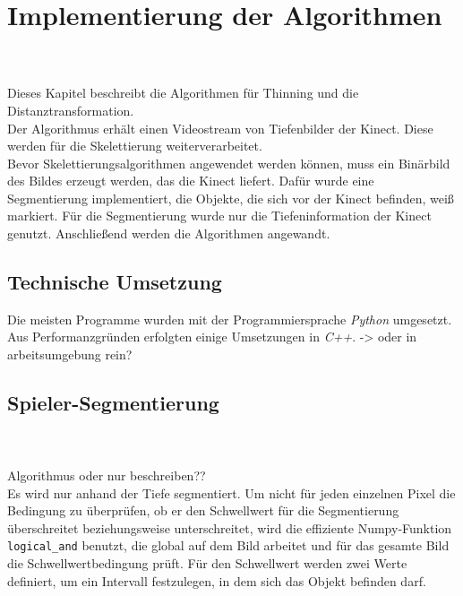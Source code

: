 \chapter{Implementierung der Algorithmen}
\\\\
Dieses Kapitel beschreibt die Algorithmen für Thinning und die Distanztransformation.\\
Der Algorithmus erhält einen Videostream von Tiefenbilder der Kinect. Diese werden für die
Skelettierung weiterverarbeitet. \\
Bevor Skelettierungsalgorithmen angewendet werden können, muss ein Binärbild des Bildes erzeugt werden, 
das die Kinect liefert. Dafür wurde eine Segmentierung implementiert, die Objekte, die sich vor der
Kinect befinden, weiß markiert. Für die Segmentierung wurde nur die Tiefeninformation der Kinect genutzt.
Anschließend werden die Algorithmen angewandt. 
\begin{algorithm}
\begin{algorithmic}[1]
\EndWhile
\EndProcedure
\end{algorithmic}
\end{algorithm}
\section{Technische Umsetzung}
Die meisten Programme wurden mit der Programmiersprache \emph{Python} umgesetzt. Aus Performanzgründen 
erfolgten einige Umsetzungen in \emph{C++}. -> oder in arbeitsumgebung rein?\\
\section{Spieler-Segmentierung}
\\\\
Algorithmus oder nur beschreiben??\\
Es wird nur anhand der Tiefe segmentiert. Um nicht für jeden einzelnen Pixel die Bedingung zu überprüfen, ob er den Schwellwert für die Segmentierung überschreitet beziehungsweise unterschreitet, wird die effiziente Numpy-Funktion \texttt{logical\_and} benutzt, die global auf dem Bild arbeitet und für das gesamte Bild die Schwellwertbedingung prüft. Für den Schwellwert werden zwei 
Werte definiert, um ein Intervall festzulegen, in dem sich das Objekt befinden darf. 
